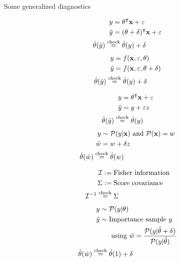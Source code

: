 \begin{frame}{Some generalized diagnostics}

\vspace{2em}

{
$$
\begin{aligned}
    y ={}& \theta^\intercal \mathbf{x} + \varepsilon \\
    \tilde{y} ={}& (\theta + \delta)^\intercal \mathbf{x} + \varepsilon \\
    \hat{\theta}(\tilde{y}) \overset{\textrm{check}}{=}{}& \hat{\theta}(y) + \delta
\end{aligned}
$$
}{
$$
\begin{aligned}
    y ={}& f(\mathbf{x}, \varepsilon, \theta) \\
    \tilde{y} ={}& f(\mathbf{x}, \varepsilon, \theta + \delta) \\
    \hat{\theta}(\tilde{y}) \overset{\textrm{check}}{=}{}& \hat{\theta}(y) + \delta
\end{aligned}
$$
}

\methodspacer

{
$$
\begin{aligned}
    y ={}& \theta^\intercal \mathbf{x} + \varepsilon \\
    \tilde{y} ={}& y + \varepsilon z \\
    \hat{\theta}(\tilde{y}) \overset{\textrm{check}}{=}{}& \hat{\theta}(y)
\end{aligned}
$$
}{
$$
\begin{aligned}
    y \sim{}& \mathcal{P}(y \vert \mathbf{x}) \textrm{ and } \mathcal{P}(\mathbf{x}) ={} w \\
    \tilde{w} ={}& w + \delta z \\
    \hat{\theta}(\tilde{w}) \overset{\textrm{check}}{=}{}& \hat{\theta}(w)
\end{aligned}
$$
}


\methodspacer


{
$$
\begin{aligned}
    \mathcal{I} :={}& \textrm{Fisher information}\\
    \Sigma :={}& \textrm{Score covariance} \\
    \mathcal{I}^{-1} \overset{\textrm{check}}{=}{}& \Sigma
\end{aligned}
$$
}{
$$
\begin{aligned}
    y \sim{}& \mathcal{P}(y \vert \theta) \\
    \tilde{y} \sim{}& \textrm{Importance sample }y\\
    &\textrm{ using }\tilde{w} ={} \frac{\mathcal{P}(y \vert \hat{\theta} + \delta)}{\mathcal{P}(y \vert \hat{\theta})} \\
    \hat{\theta}(\tilde{w}) \overset{\textrm{check}}{=}{}& \hat{\theta}(1) + \delta
\end{aligned}
$$
}


\vspace{2em}


\end{frame}


